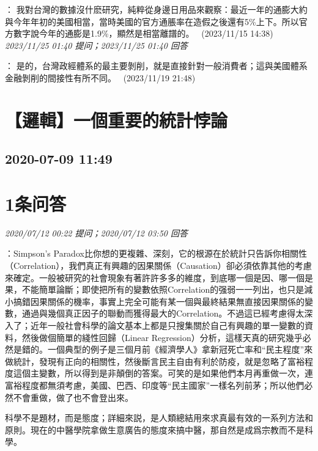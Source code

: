 \documentclass[twocolumn]{ctexart}
\begin{document}
：
我對台灣的數據沒什麽研究，純粹從身邊日用品來觀察：最近一年的通膨大約與今年年初的美國相當，當時美國的官方通脹率在造假之後還有5\%上下。所以官方數字說今年的通膨是1.9\%，顯然是相當離譜的。 
 (2023/11/15 14:38)
\\

\textit{\hfill\noindent\small 2023/11/25 01:40 提问；2023/11/25 01:40 回答}

：
是的，台灣政經體系的最主要剝削，就是直接針對一般消費者；這與美國體系金融剝削的間接性有所不同。 
 (2023/11/19 21:48)
\\


\section{【邏輯】一個重要的統計悖論}
\subsection{2020-07-09 11:49}


\section{1条问答}

\textit{\hfill\noindent\small 2020/07/12 00:22 提问；2020/07/12 03:50 回答}

：Simpson's Paradox比你想的更複雜、深刻，它的根源在於統計只告訴你相關性（Correlation），我們真正有興趣的因果關係（Causation）卻必須依靠其他的考慮來確定。一般被研究的社會現象有著許許多多的維度，到底哪一個是因、哪一個是果，不能簡單論斷；即使把所有的變數依照Correlation的强弱一一列出，也只是減小搞錯因果關係的機率，事實上完全可能有某一個與最終結果無直接因果關係的變數，通過與幾個真正因子的聯動而獲得最大的Correlation。不過這已經考慮得太深入了；近年一般社會科學的論文基本上都是只搜集關於自己有興趣的單一變數的資料，然後做個簡單的綫性回歸（Linear Regression）分析，這樣天真的研究幾乎必然是錯的。一個典型的例子是三個月前《經濟學人》拿新冠死亡率和“民主程度”來做統計，發現有正向的相關性，然後斷言民主自由有利於防疫，就是忽略了富裕程度這個主變數，所以得到是非顛倒的答案。可笑的是如果他們本月再重做一次，連富裕程度都無須考慮，美國、巴西、印度等“民主國家”一樣名列前茅；所以他們必然不會重做，做了也不會登出來。

科學不是題材，而是態度；詳細來説，是人類總結用來求真最有效的一系列方法和原則。現在的中醫學院拿做生意廣告的態度來搞中醫，那自然是成爲宗教而不是科學。
\\
\end{document}
